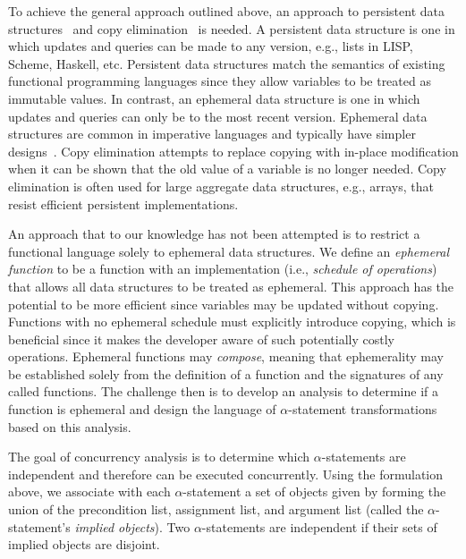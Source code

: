 To achieve the general approach outlined above, an approach to persistent data structures~\cite{driscoll1989making} and copy elimination~\cite{gopinath1989copy} is needed.
A persistent data structure is one in which updates and queries can be made to any version, e.g., lists in LISP, Scheme, Haskell, etc.
Persistent data structures match the semantics of existing functional programming languages since they allow variables to be treated as immutable values.
In contrast, an ephemeral data structure is one in which updates and queries can only be to the most recent version.
Ephemeral data structures are common in imperative languages and typically have simpler designs~\cite{okasaki1999purely}.
Copy elimination attempts to replace copying with in-place modification when it can be shown that the old value of a variable is no longer needed.
Copy elimination is often used for large aggregate data structures, e.g., arrays, that resist efficient persistent implementations.

An approach that to our knowledge has not been attempted is to restrict a functional language solely to ephemeral data structures.
We define an \emph{ephemeral function} to be a function with an implementation (i.e., \emph{schedule of operations}) that allows all data structures to be treated as ephemeral.
This approach has the potential to be more efficient since variables may be updated without copying.
Functions with no ephemeral schedule must explicitly introduce copying, which is beneficial since it makes the developer aware of such potentially costly operations.
Ephemeral functions may \emph{compose}, meaning that ephemerality may be established solely from the definition of a function and the signatures of any called functions.
The challenge then is to develop an analysis to determine if a function is ephemeral and design the language of $\alpha$-statement transformations based on this analysis.

The goal of concurrency analysis is to determine which $\alpha$-statements are independent and therefore can be executed concurrently.
Using the formulation above, we associate with each $\alpha$-statement a set of objects given by forming the union of the precondition list, assignment list, and argument list (called the $\alpha$-statement's \emph{implied objects}).
Two $\alpha$-statements are independent if their sets of implied objects are disjoint.


